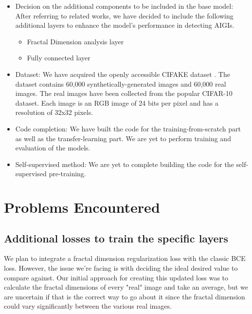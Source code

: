\documentclass[10pt,twocolumn,letterpaper]{article}
\begin{document}
\begin{itemize}
    \item Decision on the additional components to be included in the base model: After referring to related works, we have decided to include the following additional layers to enhance the model's performance in detecting AIGIs.
    \begin{itemize}
        \item Fractal Dimension analysis layer
        \item Fully connected layer
    \end{itemize}

    \item Dataset: We have acquired the openly accessible CIFAKE dataset \cite{cifake}. The dataset contains 60,000 synthetically-generated images and 60,000 real images. The real images have been collected from the popular CIFAR-10 dataset. Each image is an RGB image of 24 bits per pixel and has a resolution of 32x32 pixels.

    \item Code completion: We have built the code for the training-from-scratch part as well as the transfer-learning part. We are yet to perform training and evaluation of the models.

    \item Self-supervised method: We are yet to complete building the code for the self-supervised pre-training.
    
\end{itemize}

\section{Problems Encountered}

\subsection{Additional losses to train the specific layers}

We plan to integrate a fractal dimension regularization loss with the classic BCE loss. However, the issue we're facing is with deciding the ideal desired value to compare against. Our initial approach for creating this updated loss was to calculate the fractal dimensions of every "real" image and take an average, but we are uncertain if that is the correct way to go about it since the fractal dimension could vary significantly between the various real images.
\end{document}
